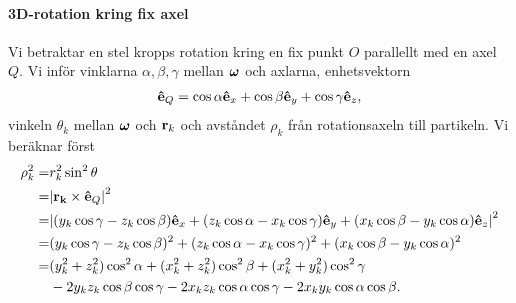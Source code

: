 \paragraph{3D-rotation kring fix axel}
Vi betraktar en stel kropps rotation kring en fix punkt $O$ parallellt med en axel $Q$. Vi inför vinklarna $\alpha, \beta, \gamma$ mellan $\vb*{\omega}$ och axlarna, enhetsvektorn
\begin{align*}
	\vu{e}_{Q} = \cos{\alpha}\vu{e}_{x} + \cos{\beta}\vu{e}_{y} + \cos{\gamma}\vu{e}_{z},
\end{align*}
vinkeln $\theta_k$ mellan $\vb*{\omega}$ och $\vb{r}_{k}$ och avståndet $\rho_{k}$ från rotationsaxeln till partikeln. Vi beräknar först
\begin{align*}
	\rho_{k}^2 =& r_{k}^2\sin^{2}{\theta} \\
	           =& \abs{\vb{r_{k}}\times\vu{e}_{Q}}^2 \\
	           =& \abs{(y_{k}\cos{\gamma} - z_{k}\cos{\beta})\vu{e}_{x} + (z_{k}\cos{\alpha} - x_{k}\cos{\gamma})\vu{e}_{y} + (x_{k}\cos{\beta} - y_{k}\cos{\alpha})\vu{e}_{z}}^2 \\
	           =& (y_{k}\cos{\gamma} - z_{k}\cos{\beta})^2 + (z_{k}\cos{\alpha} - x_{k}\cos{\gamma})^2 + (x_{k}\cos{\beta} - y_{k}\cos{\alpha})^2 \\
	           =& (y_{k}^2 + z_{k}^2)\cos^{2}{\alpha} + (x_{k}^2 + z_{k}^2)\cos^{2}{\beta} + (x_{k}^2 + y_{k}^2)\cos^{2}{\gamma} \\
	            &- 2y_{k}z_{k}\cos{\beta}\cos{\gamma} - 2x_{k}z_{k}\cos{\alpha}\cos{\gamma} - 2x_{k}y_{k}\cos{\alpha}\cos{\beta}.
\end{align*}

